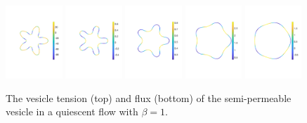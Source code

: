 \documentclass[aps,prl,showpacs]{revtex4}
\begin{document}
\begin{figure}[htp]
  \includegraphics[width=0.19\textwidth,trim =2cm 5cm 0cm 5cm, clip=true]{figures/StarFluxTime1.pdf}
  \includegraphics[width=0.19\textwidth,trim =2cm 5cm 0cm 5cm, clip=true]{figures/StarFluxTime2.pdf}
  \includegraphics[width=0.19\textwidth,trim =2cm 5cm 0cm 5cm, clip=true]{figures/StarFluxTime3.pdf}
  \includegraphics[width=0.19\textwidth,trim =2cm 5cm 0cm 5cm, clip=true]{figures/StarFluxTime4.pdf}
  \includegraphics[width=0.19\textwidth,trim =2cm 5cm 0cm 5cm, clip=true]{figures/StarFluxTime5.pdf}
  \caption{\label{fig:starTensionFlux} The vesicle tension (top) and
  flux (bottom) of the semi-permeable vesicle in a quiescent
  flow with $\beta=1$.}
\end{figure}
\end{document}
